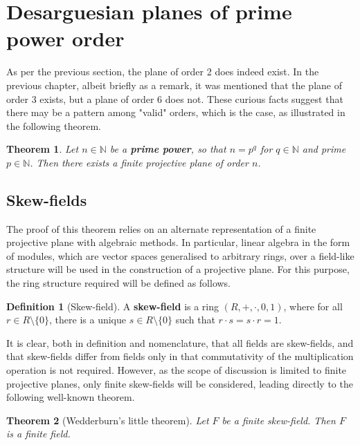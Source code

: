 \documentclass{report}
\newcommand{\N}{\mathbb{N}}
\newtheorem{theorem}{Theorem}[section]
\theoremstyle{definition}\newtheorem*{definition}{Definition}
\theoremstyle{definition}\newtheorem*{example}{Example}
\theoremstyle{remark}\newtheorem*{remark}{Remark}
\begin{document}
\section{Desarguesian planes of prime power order}

As per the previous section, the plane of order 2 does indeed exist. In the previous chapter, albeit briefly as a remark, it was mentioned that the plane of order 3 exists, but a plane of order 6 does not. These curious facts suggest that there may be a pattern among "valid" orders, which is the case, as illustrated in the following theorem.

\begin{theorem}
\label{thm:primepower}
Let $ n \in \N $ be a \textbf{prime power}, so that $ n = p^q $ for $ q \in \N $ and prime $ p \in \N $. Then there exists a finite projective plane of order $ n $.
\end{theorem}

\subsection{Skew-fields}

The proof of this theorem relies on an alternate representation of a finite projective plane with algebraic methods. In particular, linear algebra in the form of modules, which are vector spaces generalised to arbitrary rings, over a field-like structure will be used in the construction of a projective plane. For this purpose, the ring structure required will be defined as follows.

\begin{definition}[Skew-field]
A \textbf{skew-field} is a ring $ (R, +, \cdot, 0, 1) $, where for all $ r \in R \setminus \{ 0 \} $, there is a unique $ s \in R \setminus \{ 0 \} $ such that $ r \cdot s = s \cdot r = 1 $.
\end{definition}

It is clear, both in definition and nomenclature, that all fields are skew-fields, and that skew-fields differ from fields only in that commutativity of the multiplication operation is not required. However, as the scope of discussion is limited to finite projective planes, only finite skew-fields will be considered, leading directly to the following well-known theorem.

\begin{theorem}[Wedderburn's little theorem]
\label{thm:wedderburn}
Let $ F $ be a finite skew-field. Then $ F $ is a finite field.
\end{theorem}
\end{document}
